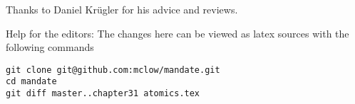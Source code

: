 



Thanks to Daniel Krügler for his advice and reviews.

\vfill
Help for the editors: The changes here can be viewed as latex sources with the following commands
\begin{verbatim}
git clone git@github.com:mclow/mandate.git
cd mandate
git diff master..chapter31 atomics.tex
\end{verbatim}
